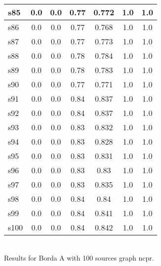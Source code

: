 \documentclass{article}
\begin{document}
\begin{tabular}{|l|c|c|c|c|c|c|}
\hline
s85 &0.0 & 0.0 & 0.77 & 0.772 & 1.0 & 1.0\\
\hline
s86 &0.0 & 0.0 & 0.77 & 0.768 & 1.0 & 1.0\\
\hline
s87 &0.0 & 0.0 & 0.77 & 0.773 & 1.0 & 1.0\\
\hline
s88 &0.0 & 0.0 & 0.78 & 0.784 & 1.0 & 1.0\\
\hline
s89 &0.0 & 0.0 & 0.78 & 0.783 & 1.0 & 1.0\\
\hline
s90 &0.0 & 0.0 & 0.77 & 0.771 & 1.0 & 1.0\\
\hline
s91 &0.0 & 0.0 & 0.84 & 0.837 & 1.0 & 1.0\\
\hline
s92 &0.0 & 0.0 & 0.84 & 0.837 & 1.0 & 1.0\\
\hline
s93 &0.0 & 0.0 & 0.83 & 0.832 & 1.0 & 1.0\\
\hline
s94 &0.0 & 0.0 & 0.83 & 0.828 & 1.0 & 1.0\\
\hline
s95 &0.0 & 0.0 & 0.83 & 0.831 & 1.0 & 1.0\\
\hline
s96 &0.0 & 0.0 & 0.83 & 0.83 & 1.0 & 1.0\\
\hline
s97 &0.0 & 0.0 & 0.83 & 0.835 & 1.0 & 1.0\\
\hline
s98 &0.0 & 0.0 & 0.84 & 0.84 & 1.0 & 1.0\\
\hline
s99 &0.0 & 0.0 & 0.84 & 0.841 & 1.0 & 1.0\\
\hline
s100 &0.0 & 0.0 & 0.84 & 0.842 & 1.0 & 1.0\\
\hline
\end{tabular}\\

\noindent Results for Borda A with 100 sources graph ncpr.
\end{document}
